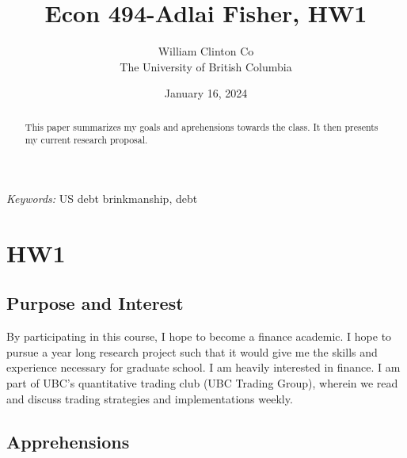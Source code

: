 \documentclass[
  12pt]{article}
\begin{document}
\def\spacingset#1{\renewcommand{\baselinestretch}%
{#1}\small\normalsize} \spacingset{1}



\date{January 16, 2024}
\title{\bf Econ 494-Adlai Fisher, HW1}
\author{
William Clinton Co\\
The University of British Columbia\\
}
\maketitle

\bigskip
\bigskip
\begin{abstract}
This paper summarizes my goals and aprehensions towards the class. It
then presents my current research proposal.
\end{abstract}

\noindent%
{\it Keywords:} US debt brinkmanship, debt
\vfill

\newpage
\spacingset{1.9} %
\ifdefined\Shaded\renewenvironment{Shaded}{\begin{tcolorbox}[interior hidden, frame hidden, breakable, sharp corners, borderline west={3pt}{0pt}{shadecolor}, boxrule=0pt, enhanced]}{\end{tcolorbox}}\fi

\hypertarget{sec-l}{%
\section{HW1}\label{sec-l}}

\hypertarget{purpose-and-interest}{%
\subsection{Purpose and Interest}\label{purpose-and-interest}}

By participating in this course, I hope to become a finance academic. I
hope to pursue a year long research project such that it would give me
the skills and experience necessary for graduate school. I am heavily
interested in finance. I am part of UBC's quantitative trading club (UBC
Trading Group), wherein we read and discuss trading strategies and
implementations weekly.

\hypertarget{apprehensions}{%
\subsection{Apprehensions}\label{apprehensions}}
\end{document}
